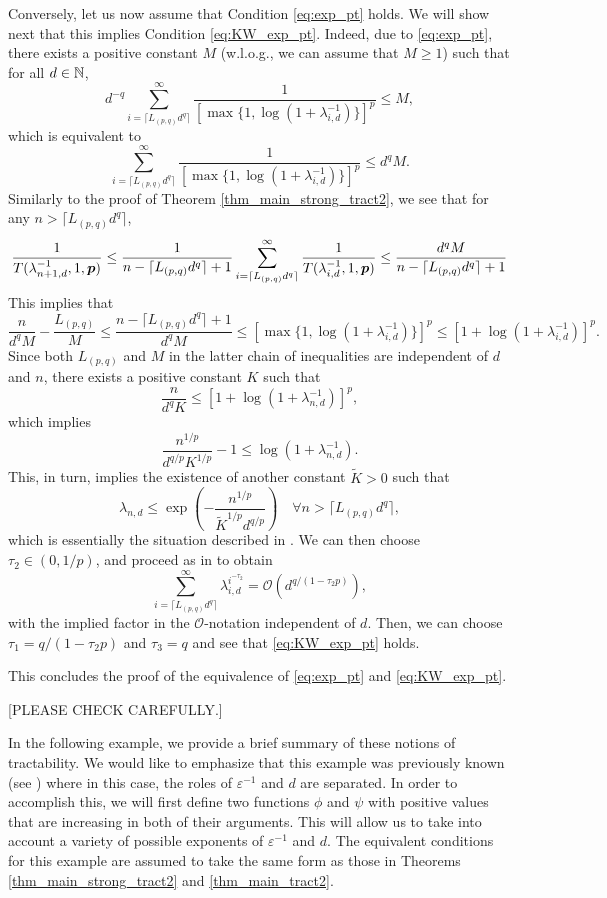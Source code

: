 \documentclass[sort&compress]{elsarticle}
\newcommand{\kachi}[1]{\begingroup\color{ForestGreen}#1\endgroup}
\begin{document}
{Conversely, let us now assume that Condition \eqref{eq:exp_pt} holds. We will show next that this implies Condition \eqref{eq:KW_exp_pt}. Indeed, due to \eqref{eq:exp_pt}, there exists a positive constant $M$ (w.l.o.g., we can assume that $M\ge 1$) such that for all $d\in\mathbb{N}$,
\[
d^{-q} 
\sum_{i=\lceil L_{(p,q)} d^{q}\rceil}^\infty \frac{1}{[\max\{1,\log(1+\lambda_{i,d}^{-1})\}]^p} \le M,
\]
which is equivalent to 
\[
\sum_{i=\lceil L_{(p,q)} d^{q}\rceil}^\infty \frac{1}{[\max\{1,\log(1+\lambda_{i,d}^{-1})\}]^p} \le d^q M. 
\]
Similarly to the proof of Theorem \ref{thm_main_strong_tract2}, we see that for any $n > \lceil L_{(p,q)} d^{q}\rceil $, 
\[
\frac{1}{T(\lambda_{n+1,d}^{-1},1,\boldsymbol{p})} \le \frac{1}{n-\lceil L_{(p,q)} d^{q}\rceil +1 }
\sum_{i=\lceil L_{(p,q)} d^{q}\rceil}^\infty  \frac{1}{T(\lambda_{i,d}^{-1},1,\boldsymbol{p})}
\le \frac{d^q M}{n-\lceil L_{(p,q)} d^{q}\rceil +1 }
\]
This implies that
\[
\frac{n}{d^q M}-\frac{L_{(p,q)}}{M}\le\frac{n-\lceil L_{(p,q)} d^{q}\rceil +1 }{d^q M} \le [\max\{1,\log(1+\lambda_{i,d}^{-1})\}]^p 
\le [1 + \log(1+\lambda_{i,d}^{-1})]^p.
\]
Since both $L_{(p,q)}$ and $M$ in the latter chain of inequalities are independent of $d$ and $n$, there 
exists a positive constant $K$ such that 
\[
\frac{n}{d^q K} \le [1 + \log(1+\lambda_{n,d}^{-1})]^p,
\]
which implies 
\[
\frac{n^{1/p}}{d^{q/p} K^{1/p}} -1 \le \log(1+\lambda_{n,d}^{-1}).
\]
This, in turn, implies the existence of another constant $\widetilde{K}>0$ such that 
\[
\lambda_{n,d} \le \exp\left(-\frac{n^{1/p}}{\widetilde{K}^{1/p} d^{q/p}}\right)
\quad \forall n > \lceil L_{(p,q)} d^{q}\rceil,
\]
which is essentially the situation described in \cite[p.~118]{KriWoz19a}. We can then choose $\tau_2\in (0,1/p)$, 
and proceed as in \cite{KriWoz19a} to obtain 
\[
\sum_{i=\lceil L_{(p,q)} d^{q}\rceil}^\infty \lambda_{i,d}^{i^{-\tau_2}}=\mathcal{O}(d^{q/(1-\tau_2 p)}),
\]
with the implied factor in the $\mathcal{O}$-notation independent of $d$. Then, we can choose $\tau_1=q/(1-\tau_2 p)$ and $\tau_3=q$ and see that \eqref{eq:KW_exp_pt} holds.

This concludes the proof of the equivalence of \eqref{eq:exp_pt} and \eqref{eq:KW_exp_pt}.

\bigskip

[PLEASE CHECK CAREFULLY.]}

\kachi{In the following example, we provide a brief summary of these notions of tractability. We would like to emphasize that this example was previously known (see \cite{?}) where in this case, the roles of $\varepsilon^{-1}$ and $d$ are separated. In order to accomplish this, we will first define two functions $\phi$ and $\psi$ with positive values that are increasing in both of their arguments. This will allow us to take into account a variety of possible exponents of $\varepsilon^{-1}$ and $d$.
The equivalent conditions for this example are assumed to take the same form as those in Theorems \ref{thm_main_strong_tract2} and \ref{thm_main_tract2}.}
\end{document}
